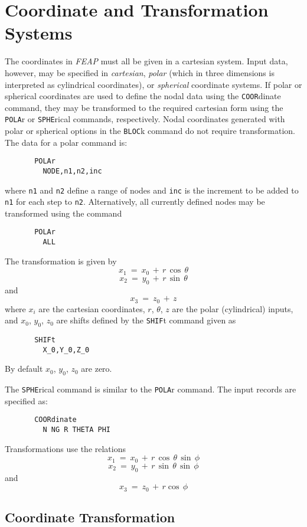 \section{Coordinate and Transformation Systems}
\label{transform}

The coordinates in {\sl FEAP} must all be given in a cartesian system.
Input data, however, may be specified in {\it cartesian}, {\it polar}
(which in three dimensions is interpreted as cylindrical coordinates),
or {\it spherical} coordinate systems.  If polar or spherical coordinates
are used to define the nodal data using the {\tt COOR}\-dinate command,
they may be transformed to the required
cartesian form using the {\tt POLA}r or {\tt SPHE}rical commands, respectively.
Nodal coordinates generated with polar or spherical options in the {\tt BLOC}k
command do not require transformation. 
The data for a polar command is:
\begin{verbatim}
       POLAr
         NODE,n1,n2,inc
\end{verbatim}
\par\noindent
where {\tt n1} and {\tt n2} define a range of nodes and {\tt inc} is
the increment to be added to {\tt n1} for each step to {\tt n2}.  Alternatively,
all currently defined nodes may be transformed using the command
\begin{verbatim}
       POLAr
         ALL
\end{verbatim}
\par\noindent
The transformation is given by
$$ x_1 ~=~ x_0 \, + \, r \, \cos \, \theta$$
$$ x_2 ~=~ y_0 \, + \, r \, \sin \, \theta$$
and
$$ x_3 ~=~ z_0 \, + \, z$$
where $x_i$ are the cartesian coordinates, $r$, $\theta$, $z$ are the
polar (cylindrical) inputs, and $x_0$, $y_0$, $z_0$ are shifts defined
by the {\tt SHIF}t command given as
\begin{verbatim}
       SHIFt
         X_0,Y_0,Z_0
\end{verbatim}
By default $x_0$, $y_0$, $z_0$ are zero.

The {\tt SPHE}rical command is similar to the {\tt POLA}r command.  The
input records are specified as:
\begin{verbatim}
       COORdinate
         N NG R THETA PHI
\end{verbatim}
Transformations use the relations
$$ x_1 ~=~ x_0 \, + \, r \, \cos \, \theta \, \sin \, \phi$$
$$ x_2 ~=~ y_0 \, + \, r \, \sin \, \theta \, \sin \, \phi$$
and
$$ x_3 ~=~ z_0 \, + \, r \cos \, \phi$$

\subsection{Coordinate Transformation}

